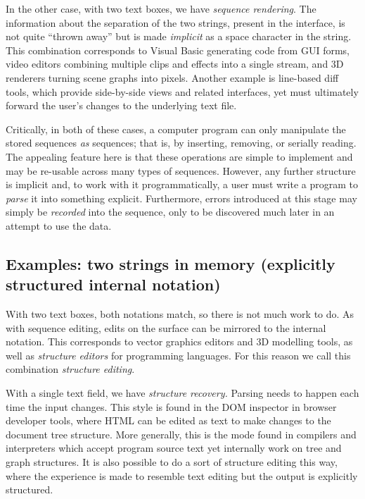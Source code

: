\documentclass[ twoside,openright,titlepage,numbers=noenddot,headinclude,footinclude,cleardoublepage=empty,abstract=on,
                BCOR=5mm,paper=a4,fontsize=11pt
                ]{scrreprt}
\newcommand{\joel}[1]{}
\theoremstyle{definition}
\begin{document}
In the other case, with two text boxes, we have \emph{sequence
rendering}. The information about the separation of the two strings,
present in the interface, is not quite ``thrown away'' but is made
\emph{implicit} as a space character in the string. This combination
corresponds to Visual Basic generating code from GUI forms, video
editors combining multiple clips and effects into a single stream, and
3D renderers turning scene graphs into pixels. Another example is
line-based diff tools, which provide side-by-side views and related
interfaces, yet must ultimately forward the user's changes to the
underlying text file.

Critically, in both of these cases, a computer program can only
manipulate the stored sequences \emph{as} sequences; that is, by
inserting, removing, or serially reading. The appealing feature here is
that these operations are simple to implement and may be re-usable
across many types of sequences. However, any further structure is
implicit and, to work with it programmatically, a user must write a
program to \emph{parse} it into something explicit. Furthermore, errors
introduced at this stage may simply be \emph{recorded} into the
sequence, only to be discovered much later in an attempt to use the
data.

\hypertarget{examples-two-strings-in-memory-explicitly-structured-internal-notation}{\subsection{Examples: two strings in memory (explicitly structured
internal
notation)}\label{examples-two-strings-in-memory-explicitly-structured-internal-notation}}

\joel{TODO: cite The Many Forms of a Single Fact}

With two text boxes, both notations match, so there is not much work to
do. As with sequence editing, edits on the surface can be mirrored to
the internal notation. This corresponds to vector graphics editors and
3D modelling tools, as well as \emph{structure editors} for programming
languages. For this reason we call this combination \emph{structure
editing}.

With a single text field, we have \emph{structure recovery.} Parsing
needs to happen each time the input changes. This style is found in the
DOM inspector in browser developer tools, where HTML can be edited as
text to make changes to the document tree structure. More generally,
this is the mode found in compilers and interpreters which accept
program source text yet internally work on tree and graph structures. It
is also possible to do a sort of structure editing this way, where the
experience is made to resemble text editing but the output is explicitly
structured.
\end{document}
